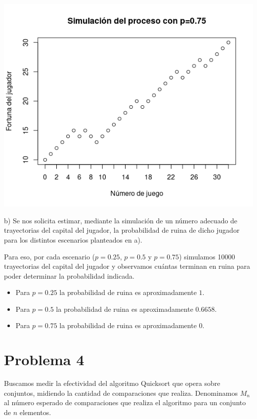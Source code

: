 \documentclass[11pt]{article}
\begin{document}
\begin{center}\includegraphics[scale = 0.55]{P3Sim3.png}\end{center}

b) Se nos solicita estimar, mediante la simulación de un número adecuado de trayectorias del capital del jugador, la
probabilidad de ruina de dicho jugador para los distintos escenarios planteados en a). 

Para eso, por cada escenario ($p=0.25$, $p=0.5$ y $p=0.75$) simulamos 10000 trayectorias del capital del jugador y observamos cuántas terminan en ruina para poder determinar la probabilidad indicada. 

\begin{itemize}
    \item Para $p=0.25$ la probabilidad de ruina es aproximadamente $1$.
    \item Para $p=0.5$ la probabilidad de ruina es aproximadamente $0.6658$.
    \item Para $p=0.75$ la probabilidad de ruina es aproximadamente $0$.
\end{itemize}


\section*{Problema 4}

Buscamos medir la efectividad del algoritmo Quicksort que opera sobre conjuntos,
midiendo la cantidad de comparaciones que realiza. Denominamos $M_n$ al
número esperado de comparaciones que realiza el algoritmo para un conjunto
de $n$ elementos.
\end{document}
